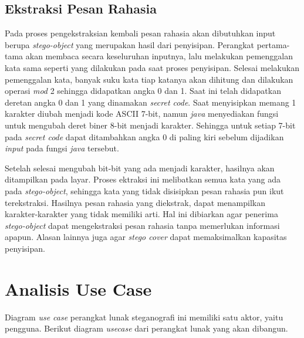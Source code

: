 \subsection{Ekstraksi Pesan Rahasia}
Pada proses pengekstraksian kembali pesan rahasia akan dibutuhkan input berupa \textit{stego-object} yang merupakan hasil dari penyisipan. Perangkat pertama-tama akan membaca secara keseluruhan inputnya, lalu melakukan pemenggalan kata sama seperti yang dilakukan pada saat proses penyisipan. Selesai melakukan pemenggalan kata, banyak suku kata tiap katanya akan dihitung dan dilakukan operasi \textit{mod} 2 sehingga didapatkan angka 0 dan 1. Saat ini telah didapatkan deretan angka 0 dan 1 yang dinamakan \textit{secret code}. Saat menyisipkan memang 1 karakter diubah menjadi kode ASCII 7-bit, namun \textit{java} menyediakan fungsi untuk mengubah deret biner 8-bit menjadi karakter. Sehingga untuk setiap 7-bit pada \textit{secret code} dapat ditambahkan angka 0 di paling kiri sebelum dijadikan \textit{input} pada fungsi \textit{java} tersebut.

Setelah selesai mengubah bit-bit yang ada menjadi karakter, hasilnya akan ditampilkan pada layar. Proses ektraksi ini melibatkan semua kata yang ada pada \textit{stego-object}, sehingga kata yang tidak disisipkan pesan rahasia pun ikut terekstraksi. Hasilnya pesan rahasia yang diekstrak, dapat menampilkan karakter-karakter yang tidak memiliki arti. Hal ini dibiarkan agar penerima \textit{stego-object} dapat mengekstraksi pesan rahasia tanpa memerlukan informasi apapun. Alasan lainnya juga agar \textit{stego cover} dapat memaksimalkan kapasitas penyisipan.

\section{Analisis Use Case}

Diagram \textit{use case} perangkat lunak steganografi ini memiliki satu aktor, yaitu pengguna. Berikut diagram \textit{usecase} dari perangkat lunak yang akan dibangun.

